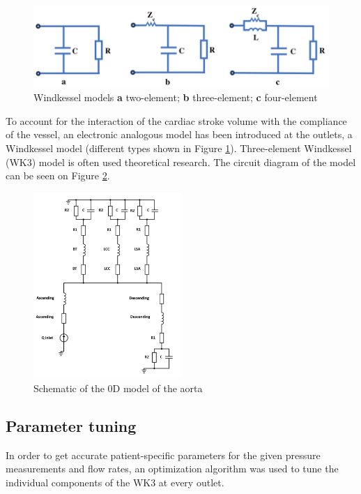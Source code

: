 \begin{figure}[ht!]
  \centering
  \includegraphics[width=\textwidth]{Figures/WK.JPG}
  \caption{Windkessel models \textbf{a} two-element; \textbf{b} three-element; \textbf{c} four-element \cite{Zhou2019APressure}}
  \label{fig:wind}
\end{figure}

To account for the interaction of the cardiac stroke volume with the compliance of the vessel, an electronic analogous model has been introduced at the outlets, a Windkessel model (different types shown in Figure \ref{fig:wind}). Three-element Windkessel (WK3) model is often used theoretical research. The circuit diagram of the model can be seen on Figure \ref{fig:0d}. \par

\begin{figure}[ht!]
  \centering
  \includegraphics[width=0.5\textwidth]{Figures/circuit.png}
  \caption{Schematic of the 0D model of the aorta}
  \label{fig:0d}
\end{figure}


\subsection{Parameter tuning}
In order to get accurate patient-specific parameters for the given pressure measurements and flow rates, an optimization algorithm was used to tune the individual components of the WK3 at every outlet. \par

